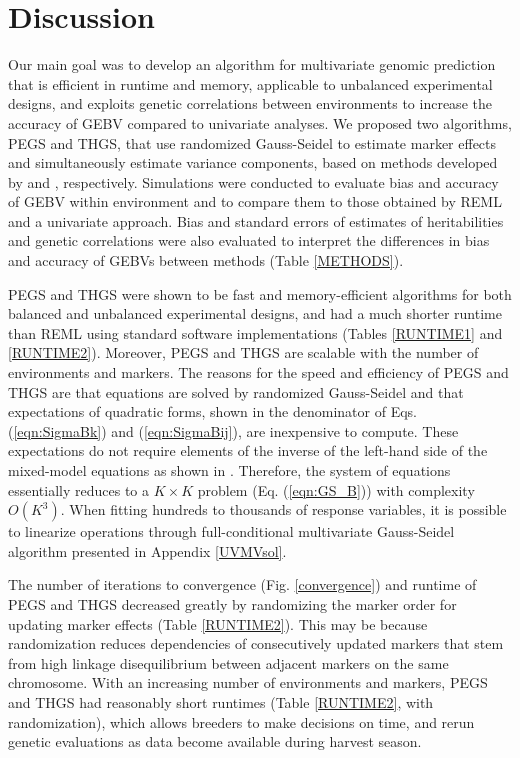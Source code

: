 \documentclass{bmcart}
\begin{document}
\section{Discussion}

Our main goal was to develop an algorithm for multivariate genomic prediction that is efficient in runtime and memory, applicable to unbalanced experimental designs, and exploits genetic correlations between environments to increase the accuracy of GEBV compared to univariate analyses. We proposed two algorithms, PEGS and THGS, that use randomized Gauss-Seidel to estimate marker effects and simultaneously estimate variance components, based on methods developed by \cite{Schaeffer} and \cite{VanRaden}, respectively. Simulations were conducted to evaluate bias and accuracy of GEBV within environment and to compare them to those obtained by REML and a univariate approach. Bias and standard errors of estimates of heritabilities and genetic correlations were also evaluated to interpret the differences in bias and accuracy of GEBVs between methods (Table \ref{METHODS}).

PEGS and THGS were shown to be fast and memory-efficient algorithms for both balanced and unbalanced experimental designs, and had a much shorter runtime than REML using standard software implementations (Tables \ref{RUNTIME1} and \ref{RUNTIME2}). Moreover, PEGS and THGS are scalable with the number of environments and markers. The reasons for the speed and efficiency of PEGS and THGS are that equations are solved by randomized Gauss-Seidel and that expectations of quadratic forms, shown in the denominator of Eqs. (\ref{eqn:SigmaBk}) and (\ref{eqn:SigmaBij}), are inexpensive to compute. These expectations do not require elements of the inverse of the left-hand side of the mixed-model equations as shown in \cite{Schaeffer}. Therefore, the system of equations essentially reduces to a $K\times K$ problem (Eq. (\ref{eqn:GS_B})) with complexity $O(K^3)$. When fitting hundreds to thousands of response variables, it is possible to linearize operations through full-conditional multivariate Gauss-Seidel algorithm presented in Appendix \ref{UVMVsol}.

The number of iterations to convergence (Fig. \ref{convergence}) and runtime of PEGS and THGS decreased greatly by randomizing the marker order for updating marker effects (Table \ref{RUNTIME2}). This may be because randomization reduces dependencies of consecutively updated markers that stem from high linkage disequilibrium between adjacent markers on the same chromosome. With an increasing number of environments and markers, PEGS and THGS had reasonably short runtimes (Table \ref{RUNTIME2}, with randomization), which allows breeders to make decisions on time, and rerun genetic evaluations as data become available during harvest season.
\end{document}
